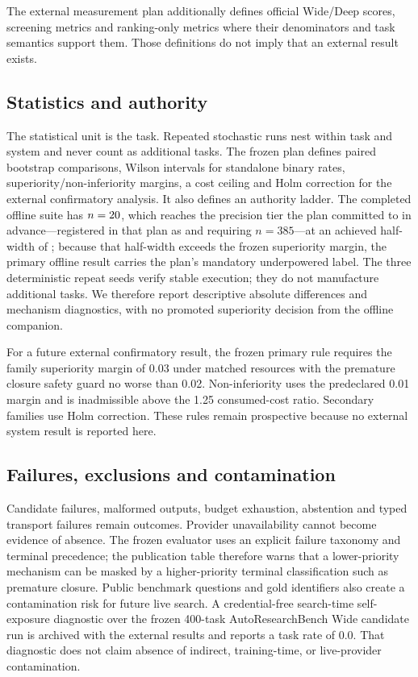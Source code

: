 The external measurement plan additionally defines official Wide/Deep scores,
screening metrics and ranking-only metrics where their denominators and task
semantics support them.  Those definitions do not imply that an external result
exists.

\subsection{Statistics and authority}
The statistical unit is the task.  Repeated stochastic runs nest within task and
system and never count as additional tasks.  The frozen plan defines paired
bootstrap comparisons, Wilson intervals for standalone binary rates,
superiority/non-inferiority margins, a cost ceiling and Holm correction for the
external confirmatory analysis.  It also defines an authority ladder.  The
completed offline suite has $n=20$, which reaches the precision
tier the plan committed to in advance---registered in that plan as
 and requiring $n=385$---at an achieved half-width of
\OfflineAchievedHalfWidth{}; because that half-width exceeds the frozen
superiority margin, the primary offline result carries the plan's mandatory
underpowered label.  The three deterministic repeat seeds verify stable
execution; they do not manufacture additional tasks.  We therefore report
descriptive absolute differences and mechanism diagnostics, with no promoted
superiority decision from the offline companion.

For a future external confirmatory result, the frozen primary rule requires the
family superiority margin of 0.03 under matched resources with the premature
closure safety guard no worse than 0.02.  Non-inferiority uses the predeclared
0.01 margin and is inadmissible above the 1.25 consumed-cost ratio.  Secondary
families use Holm correction.  These rules remain prospective because no
external system result is reported here.

\subsection{Failures, exclusions and contamination}
Candidate failures, malformed outputs, budget exhaustion, abstention and typed
transport failures remain outcomes.  Provider unavailability cannot become
evidence of absence.  The frozen evaluator uses an explicit failure taxonomy and
terminal precedence; the publication table therefore warns that a lower-priority
mechanism can be masked by a higher-priority terminal classification such as
premature closure.  Public benchmark questions and gold identifiers also create
a contamination risk for future live search.  A credential-free search-time
self-exposure diagnostic over the frozen 400-task AutoResearchBench Wide
candidate run is archived with the external results and reports a task rate of
0.0.  That diagnostic does not claim absence of indirect, training-time, or
live-provider contamination.

